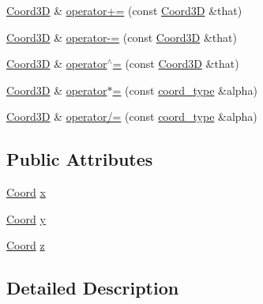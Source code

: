 \begin{DoxyCompactItemize}
\item 
\hyperlink{classMcCAD_1_1Geometry_1_1Coord3D}{Coord3D} \& \hyperlink{classMcCAD_1_1Geometry_1_1Coord3D_a58d10f2419c6e862bc7f2e79fba11dbb}{operator+=} (const \hyperlink{classMcCAD_1_1Geometry_1_1Coord3D}{Coord3D} \&that)
\item 
\hyperlink{classMcCAD_1_1Geometry_1_1Coord3D}{Coord3D} \& \hyperlink{classMcCAD_1_1Geometry_1_1Coord3D_aed048b084632193753138b4dfdb10268}{operator-\/=} (const \hyperlink{classMcCAD_1_1Geometry_1_1Coord3D}{Coord3D} \&that)
\item 
\hyperlink{classMcCAD_1_1Geometry_1_1Coord3D}{Coord3D} \& \hyperlink{classMcCAD_1_1Geometry_1_1Coord3D_ac8b374b816f081bff24770ddb51528be}{operator$^\wedge$=} (const \hyperlink{classMcCAD_1_1Geometry_1_1Coord3D}{Coord3D} \&that)
\item 
\hyperlink{classMcCAD_1_1Geometry_1_1Coord3D}{Coord3D} \& \hyperlink{classMcCAD_1_1Geometry_1_1Coord3D_a16e9d49b3182dc86a032afd3b3d47551}{operator$\ast$=} (const \hyperlink{namespaceMcCAD_1_1Geometry_ac043b37a4a7e849fca22869e1982d2f8}{coord\+\_\+type} \&alpha)
\item 
\hyperlink{classMcCAD_1_1Geometry_1_1Coord3D}{Coord3D} \& \hyperlink{classMcCAD_1_1Geometry_1_1Coord3D_adb418f45f4bf5f2296b1113f0d69e1d3}{operator/=} (const \hyperlink{namespaceMcCAD_1_1Geometry_ac043b37a4a7e849fca22869e1982d2f8}{coord\+\_\+type} \&alpha)
\end{DoxyCompactItemize}
\subsection*{Public Attributes}
\begin{DoxyCompactItemize}
\item 
\hyperlink{classMcCAD_1_1Geometry_1_1Coord}{Coord} \hyperlink{classMcCAD_1_1Geometry_1_1Coord3D_a82467d541e4e330484b7f4d589b433b4}{x}
\item 
\hyperlink{classMcCAD_1_1Geometry_1_1Coord}{Coord} \hyperlink{classMcCAD_1_1Geometry_1_1Coord3D_af6512434da6e0242b2606e2341abc01d}{y}
\item 
\hyperlink{classMcCAD_1_1Geometry_1_1Coord}{Coord} \hyperlink{classMcCAD_1_1Geometry_1_1Coord3D_a5f89140bda6825a0a21d0064d05d9f4b}{z}
\end{DoxyCompactItemize}


\subsection{Detailed Description}


